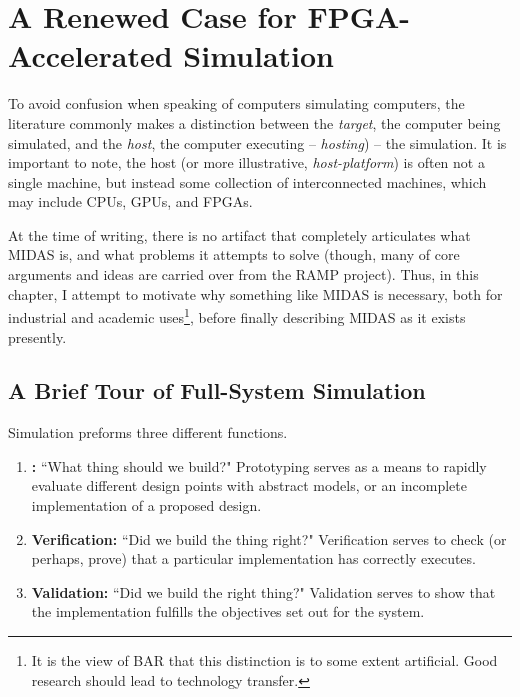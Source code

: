 \chapter{A Renewed Case for FPGA-Accelerated Simulation}

To avoid confusion when speaking of computers simulating computers, the
literature commonly makes a distinction between the \emph{target}, the computer
being simulated, and the \emph{host}, the computer executing -- \emph{hosting})
-- the simulation. It is important to note, the host (or more illustrative,
\emph{host-platform}) is often not a single machine, but instead some
collection of interconnected machines, which may include CPUs, GPUs, and FPGAs.

At the time of writing, there is no artifact that completely articulates what
MIDAS is, and what problems it attempts to solve (though, many of core
arguments and ideas are carried over from the RAMP project). Thus, in this
chapter, I attempt to motivate why something like MIDAS is necessary, both for
industrial and academic uses\footnote{It is the view of BAR that this
distinction is to some extent artificial. Good research should lead to
technology transfer.}, before finally describing MIDAS as it exists presently.

\section{A Brief Tour of Full-System Simulation}

Simulation preforms three different functions.

\begin{enumerate}

    \item \textbf{:} ``What thing should we build?" Prototyping
        serves as a means to rapidly evaluate different design points with
        abstract models, or an incomplete implementation of a proposed design.

    \item \textbf{Verification:} ``Did we build the thing right?" Verification
        serves to check (or perhaps, prove) that a particular implementation
        has correctly executes.

    \item \textbf{Validation:} ``Did we build the right thing?" Validation
        serves to show that the implementation fulfills the objectives set out
        for the system.

\end{enumerate}

